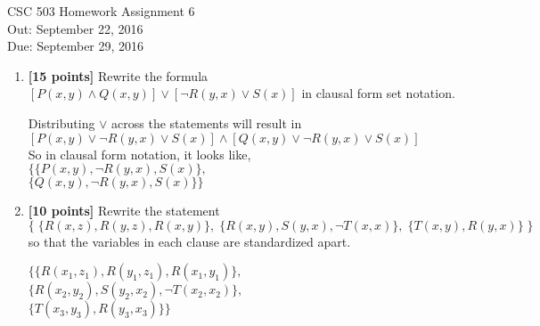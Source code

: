 \documentclass{article}
\begin{document}
\begin{center}
  {\LARGE CSC 503 Homework Assignment 6}\\[1pc]
  Out: September 22, 2016 \\
  Due: September 29, 2016 \\
\end{center}


\begin{enumerate}

\item \textbf{[15 points]} Rewrite the formula
  $[P(x,y) \land Q(x,y)] \lor [\neg R(y,x) \lor S(x)]$ in clausal form
  set notation.
  \begin{answer}
  Distributing $\lor$ across the statements will result in  $[P(x,y) \lor \neg R(y,x) \lor S(x) ] \land [Q(x,y) \lor \neg R(y,x) \lor S(x) ]   $ \\
  So in clausal form notation, it looks like,\\
  $\{\{P(x,y) , \neg R(y,x), S(x)\},$\\
  $\{Q(x,y), \neg R(y,x) , S(x)\}\}$
  \end{answer}

\item \textbf{[10 points]} Rewrite the statement
  \begin{displaymath}
    \{ \;
    \{ R(x,z), R(y,z), R(x,y) \},
    \;
    \{ R(x,y), S(y,x), \neg T(x,x) \},
    \;
    \{ T(x,y), R(y,x) \}
    \; \}
  \end{displaymath}
  so that the variables in each clause are standardized apart.
  \begin{answer}
    $\{ \{ R(x_1,z_1), R(y_1,z_1), R(x_1,y_1) \},$\\
    $\{ R(x_2,y_2), S(y_2,x_2), \neg T(x_2,x_2) \},$\\
    $\{ T(x_3,y_3), R(y_3,x_3) \}\}$
  \end{answer}


\end{enumerate}
\end{document}

